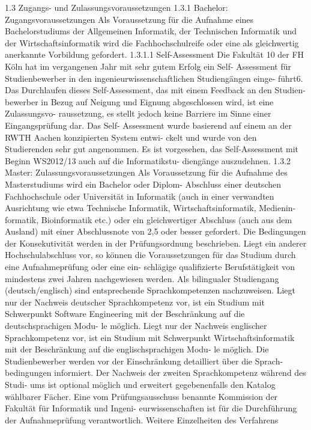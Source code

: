 1.3 Zugangs- und Zulassungsvoraussetzungen 1.3.1 Bachelor:
Zugangsvoraussetzungen Als Voraussetzung für die Aufnahme eines
Bachelorstudiums der Allgemeinen Informatik, der Technischen Informatik
und der Wirtschaftsinformatik wird die Fachhochschulreife oder eine als
gleichwertig anerkannte Vorbildung gefordert. 1.3.1.1 Self-Assessment
Die Fakultät 10 der FH Köln hat im vergangenen Jahr mit sehr gutem
Erfolg ein Self- Assessment für Studienbewerber in den
ingenieurwissenschaftlichen Studiengängen einge- führt6. Das Durchlaufen
dieses Self-Assessment, das mit einem Feedback an den Studien- bewerber
in Bezug auf Neigung und Eignung abgeschlossen wird, ist eine
Zulassungsvo- raussetzung, es stellt jedoch keine Barriere im Sinne
einer Eingangsprüfung dar. Das Self- Assessment wurde basierend auf
einem an der RWTH Aachen konzipierten System entwi- ckelt und wurde von
den Studierenden sehr gut angenommen. Es ist vorgesehen, das
Self-Assessment mit Beginn WS2012/13 auch auf die Informatikstu-
diengänge auszudehnen. 1.3.2 Master: Zulassungsvoraussetzungen Als
Voraussetzung für die Aufnahme des Masterstudiums wird ein Bachelor oder
Diplom- Abschluss einer deutschen Fachhochschule oder Universität in
Informatik (auch in einer verwandten Ausrichtung wie etwa Technische
Informatik, Wirtschaftsinformatik, Medienin- formatik, Bioinformatik
etc.) oder ein gleichwertiger Abschluss (auch aus dem Ausland) mit einer
Abschlussnote von 2,5 oder besser gefordert. Die Bedingungen der
Konsekutivität werden in der Prüfungsordnung beschrieben. Liegt ein
anderer Hochschulabschluss vor, so können die Voraussetzungen für das
Studium durch eine Aufnahmeprüfung oder eine ein- schlägige
qualifizierte Berufstätigkeit von mindestens zwei Jahren nachgewiesen
werden. Als bilingualer Studiengang (deutsch/englisch) sind
entsprechende Sprachkompetenzen nachzuweisen. Liegt nur der Nachweis
deutscher Sprachkompetenz vor, ist ein Studium mit Schwerpunkt Software
Engineering mit der Beschränkung auf die deutschsprachigen Modu- le
möglich. Liegt nur der Nachweis englischer Sprachkompetenz vor, ist ein
Studium mit Schwerpunkt Wirtschaftsinformatik mit der Beschränkung auf
die englischsprachigen Modu- le möglich. Die Studienbewerber werden vor
der Einschränkung detailliert über die Sprach- bedingungen informiert.
Der Nachweis der zweiten Sprachkompetenz während des Studi- ums ist
optional möglich und erweitert gegebenenfalls den Katalog wählbarer
Fächer. Eine vom Prüfungsausschuss benannte Kommission der Fakultät für
Informatik und Ingeni- eurwissenschaften ist für die Durchführung der
Aufnahmeprüfung verantwortlich. Weitere Einzelheiten des Verfahrens
